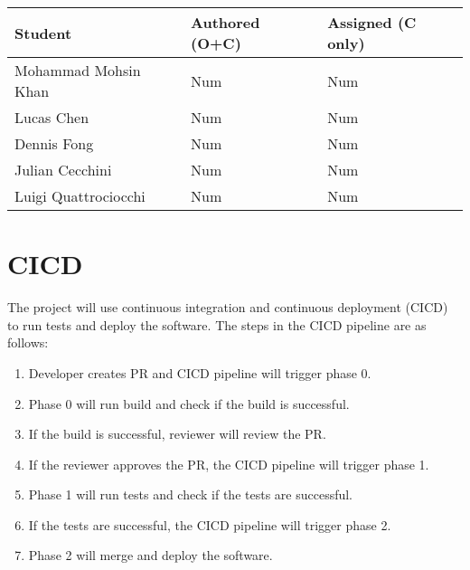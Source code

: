 \documentclass{article}
\begin{document}

\begin{table}[H]
\centering
\begin{tabular}{lll}
\toprule
\textbf{Student} & \textbf{Authored (O+C)} & \textbf{Assigned (C only)}\\
\midrule
Mohammad Mohsin Khan & Num & Num\\
Lucas Chen & Num & Num\\
Dennis Fong & Num & Num\\
Julian Cecchini & Num & Num\\
Luigi Quattrociocchi & Num & Num\\
\bottomrule
\end{tabular}
\end{table}


\section{CICD}

The project will use continuous integration and continuous deployment (CICD) to run tests and deploy the software.
The steps in the CICD pipeline are as follows:
\begin{enumerate}
  \item Developer creates PR and CICD pipeline will trigger phase 0.
  \item Phase 0 will run build and check if the build is successful.
  \item If the build is successful, reviewer will review the PR.
  \item If the reviewer approves the PR, the CICD pipeline will trigger phase 1.
  \item Phase 1 will run tests and check if the tests are successful.
  \item If the tests are successful, the CICD pipeline will trigger phase 2.
  \item Phase 2 will merge and deploy the software.
\end{enumerate}



\end{document}
